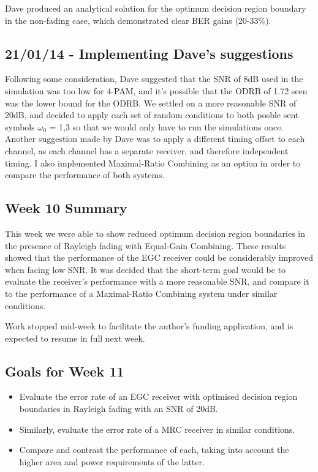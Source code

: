 Dave produced an analytical solution for the optimum decision region
boundary in the non-fading case, which demonstrated clear BER gains
(20-33\%).

\subsection{21/01/14 - Implementing Dave's suggestions}

Following some consideration, Dave suggested that the SNR of 8dB used in
the simulation was too low for 4-PAM, and it's possible that the ODRB of
1.72 seen was the lower bound for the ODRB. We settled on a more
reasonable SNR of 20dB, and decided to apply each set of random
conditions to both posble sent symbols $\omega_0$ = 1,3 so that we would
only have to run the simulations once. Another suggestion made by Dave
was to apply a different timing offset to each channel, as each channel
has a separate receiver, and therefore independent timing. I also
implemented Maximal-Ratio Combining as an option in order to compare the
performance of both systems.

\subsection{Week 10 Summary}

This week we were able to show reduced optimum decision region
boundaries in the presence of Rayleigh fading with Equal-Gain Combining.
These results showed that the performance of the EGC receiver could be
considerably improved when facing low SNR. It was decided that the
short-term goal would be to evaluate the receiver's performance with a
more reasonable SNR, and compare it to the performance of a
Maximal-Ratio Combining system under similar conditions.

Work stopped mid-week to facilitate the author's funding application,
and is expected to resume in full next week.

\subsection{Goals for Week 11}

\begin{itemize}
\itemsep1pt\parskip0pt
\item
  Evaluate the error rate of an EGC receiver with optimised decision
  region boundaries in Rayleigh fading with an SNR of 20dB.
\item
  Similarly, evaluate the error rate of a MRC receiver in similar
  conditions.
\item
  Compare and contrast the performance of each, taking into account the
  higher area and power requirements of the latter.
\end{itemize}

